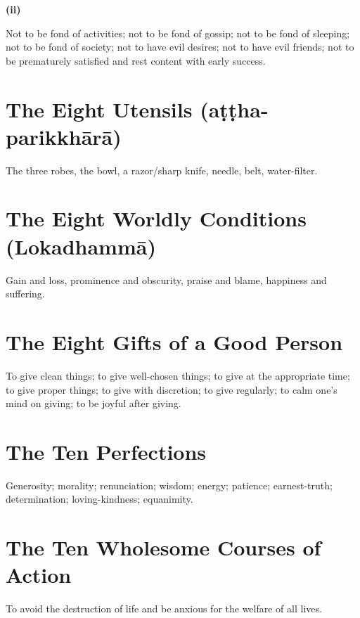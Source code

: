 \textbf{(ii)}

Not to be fond of activities;
not to be fond of gossip;
not to be fond of sleeping;
not to be fond of society;
not to have evil desires;
not to have evil friends;
not to be prematurely satisfied and rest content with early success.


\section{The Eight Utensils (aṭṭha-parikkhārā)}

The three robes, the bowl, a razor/sharp knife, needle, belt, water-filter.


\section{The Eight Worldly Conditions (Lokadhammā)}

Gain and loss, prominence and obscurity, praise and blame, happiness and
suffering.


\section{The Eight Gifts of a Good Person}

To give clean things; to give well-chosen things; to give at the appropriate
time; to give proper things; to give with discretion; to give regularly; to calm
one's mind on giving; to be joyful after giving.


\section{The Ten Perfections}

Generosity; morality; renunciation; wisdom; energy; patience; earnest-truth;
determination; loving-kindness; equanimity.


\section{The Ten Wholesome Courses of Action}

To avoid the destruction of life and be anxious for the welfare of all lives.

